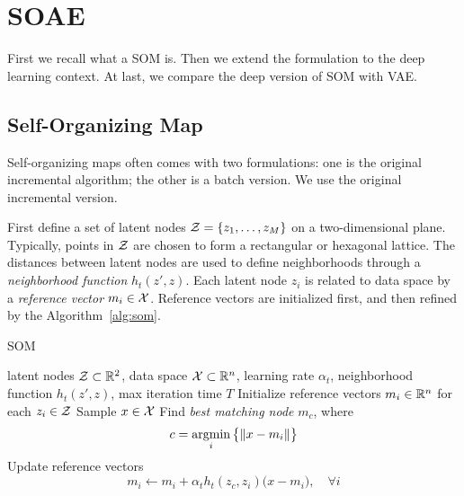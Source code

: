 \section{SOAE}\label{sec:soae}

First we recall what a SOM is.
Then we extend the formulation to the deep learning context.
At last,
we compare the deep version of SOM with VAE\@.

\subsection{Self-Organizing Map}

Self-organizing maps often comes with two formulations:
one is the original incremental algorithm;
the other is a batch version.
We use the original incremental version.

First define a set of latent nodes
\( \mathcal{Z}=\{z_1,\dots,z_M\} \)
on a two-dimensional plane.
Typically,
points in \( \mathcal{Z} \) are chosen to form a rectangular or hexagonal lattice.
The distances between latent nodes are used to define neighborhoods
through a \emph{neighborhood function} \( h_t(z',z) \).
Each latent node \( z_i \) is related to data space by a \emph{reference vector}
\( m_i\in\mathcal{X} \).
Reference vectors are initialized first,
and then refined by the Algorithm~\ref{alg:som}.

\begin{algorithm}[tb]
    \caption{SOM~\cite{kohonen1982self, kohonen1998self}}\label{alg:som}
 \begin{algorithmic}
        latent nodes \(\mathcal{Z}\subset{\mathbb{R}}^2\),
        data space \(\mathcal{X}\subset{\mathbb{R}}^n\),
        learning rate \(\alpha_t\),
        neighborhood function \(h_t(z',z)\),
        max iteration time \(T\)
    \STATE Initialize reference vectors \(m_i\in{\mathbb{R}}^n\) for each \(z_i\in\mathcal{Z}\)
    \STATE Sample \(x\in\mathcal{X}\)
    \STATE Find \emph{best matching node} \(m_c\),
        where
        \begin{equation}
            c = \mathop{\mathrm{argmin}}_i \big\{\|x-m_i\|\big\}
        \end{equation}
    \STATE Update reference vectors
        \begin{equation}\label{eq:som_update}
            m_i \leftarrow m_i + \alpha_t h_t(z_c,z_i)\big(x-m_i\big),\quad\forall i
        \end{equation}
    \ENDFOR
\end{algorithmic}
\end{algorithm}

